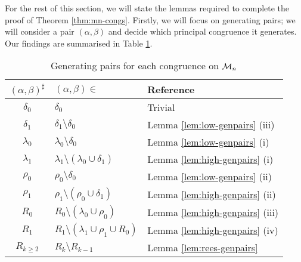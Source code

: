 For the rest of this section, we will state the lemmas required to complete the
proof of Theorem \ref{thm:mn-congs}.  Firstly, we will focus on generating
pairs; we will consider a pair $(\alpha, \beta)$ and decide which principal
congruence it generates.  Our findings are summarised in Table
\ref{tab:mn-genpairs}.

\begin{table}[h]
  \renewcommand\arraystretch{1.0}
  \centering
  \begin{tabular}{| c | l | l |}
    \hline
    $(\alpha,\beta)^\sharp$ & $(\alpha,\beta) \in$ & Reference \\
    \hline
    $\delta_0$   & $\delta_0$
                 & Trivial                             \\
    $\delta_1$   & $\delta_1 \setminus \delta_0$
                 & Lemma \ref{lem:low-genpairs} (iii)  \\
    $\lambda_0$  & $\lambda_0 \setminus \delta_0$
                 & Lemma \ref{lem:low-genpairs} (i)    \\
    $\lambda_1$  & $\lambda_1 \setminus (\lambda_0 \cup \delta_1)$
                 & Lemma \ref{lem:high-genpairs} (i)   \\
    $\rho_0$     & $\rho_0 \setminus \delta_0$
                 & Lemma \ref{lem:low-genpairs} (ii)   \\
    $\rho_1$     & $\rho_1 \setminus (\rho_0 \cup \delta_1)$
                 & Lemma \ref{lem:high-genpairs} (ii)  \\
    $R_0$        & $R_0 \setminus (\lambda_0 \cup \rho_0)$
                 & Lemma \ref{lem:high-genpairs} (iii) \\
    $R_1$        & $R_1 \setminus (\lambda_1 \cup \rho_1 \cup R_0)$
                 & Lemma \ref{lem:high-genpairs} (iv)  \\
    $R_{k \geq 2}$ & $R_k \setminus R_{k-1}$
                 & Lemma \ref{lem:rees-genpairs}       \\
    \hline
  \end{tabular}
  \caption{Generating pairs for each congruence on $\mathcal{M}_n$}
  \label{tab:mn-genpairs}
\end{table}

